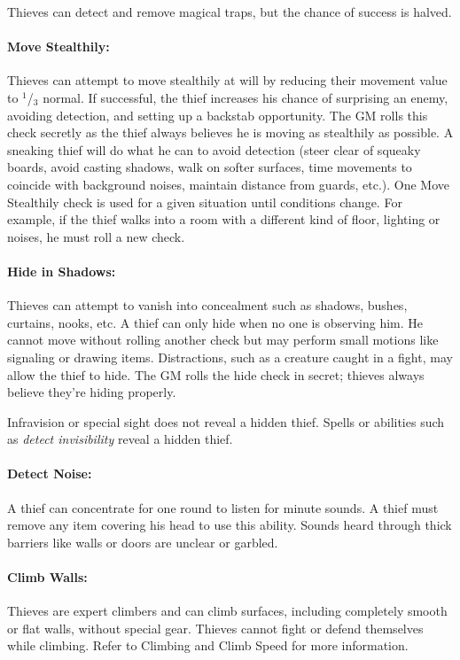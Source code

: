 \begin{multicols}{2}
Thieves can detect and remove magical traps, but the chance of success is halved. 

\paragraph{Move Stealthily:} Thieves can attempt to move stealthily at will by reducing their movement value to $^1$/$_3$ normal.  If successful, the thief increases his chance of surprising an enemy, avoiding detection, and setting up a backstab opportunity.  The GM rolls this check secretly as the thief always believes he is moving as stealthily as possible.  A sneaking thief will do what he can to avoid detection (steer clear of squeaky boards, avoid casting shadows, walk on softer surfaces, time movements to coincide with background noises, maintain distance from guards, etc.).  One Move Stealthily check is used for a given situation until conditions change.  For example, if the thief walks into a room with a different kind of floor, lighting or noises, he must roll a new check.

\paragraph{Hide in Shadows:} Thieves can attempt to vanish into concealment such as shadows, bushes, curtains, nooks, etc.  A thief can only hide when no one is observing him.  He cannot move without rolling another check but may perform small motions like signaling or drawing items.  Distractions, such as a creature caught in a fight, may allow the thief to hide.  The GM rolls the hide check in secret; thieves always believe they're hiding properly.

Infravision or special sight does not reveal a hidden thief.  Spells or abilities such as \textit{detect invisibility} reveal a hidden thief.

\paragraph{Detect Noise:} A thief can concentrate for one round to listen for minute sounds.  A thief must remove any item covering his head to use this ability.  Sounds heard through thick barriers like walls or doors are unclear or garbled. 

\paragraph{Climb Walls:} Thieves are expert climbers and can climb surfaces, including completely smooth or flat walls, without special gear.  Thieves cannot fight or defend themselves while climbing.  Refer to Climbing and Climb Speed for more information.


\end{multicols}
